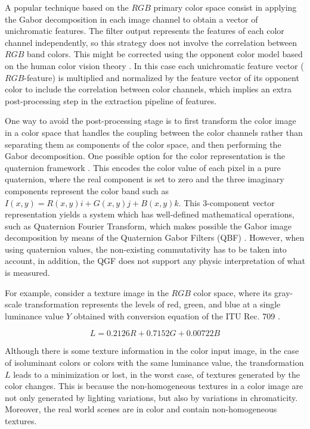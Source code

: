 A popular technique based on the $RGB$ primary color space consist in applying the Gabor decomposition in each image channel to obtain a vector of unichromatic features. The filter output represents the features of each color channel independently, so this strategy does not involve the correlation between $RGB$ band colors. This might be corrected using the opponent color model based on the human color vision theory \citep{Jain.Healey:TIP:1998}. In this case each unichromatic feature vector ($RGB$-feature) is multiplied and normalized by the feature vector of its opponent color to include the correlation between color channels, which implies an extra post-processing step in the extraction pipeline of features.

One way to avoid the post-processing stage is to first transform the color image in a color space that handles the coupling between the color channels rather than separating them as components of the color space, and then performing the Gabor decomposition. One possible option for the color representation is the quaternion framework \citep{Sangwine.Ell:VISP:2000}. This encodes the color value of each pixel in a pure quaternion, where the real component is set to zero and the three imaginary components represent the color band such as $I(x, y) = R (x, y) i + G (x, y) j + B (x, y) k $. This 3-component vector representation yields a system which has well-defined mathematical operations, such as Quaternion Fourier Transform, which makes possible the Gabor image decomposition by means of the Quaternion Gabor Filters (QBF) \citep{Subakan.Vemuri:EMMCVPR:2009}. However, when using quaternion values, the non-existing commutativity has to be taken into account, in addition, the QGF does not support any physic interpretation of what is measured.

For example, consider a texture image in the $RGB$ color space, where its gray-scale transformation represents the levels of red, green, and blue at a single luminance value $Y$ obtained with conversion equation of the ITU Rec. 709 \citep{Artusi.Banterle.ea:Book:2016}.

\begin{equation}\label{eq:color2gray_formula}
    L = 0.2126 R + 0.7152 G + 0.00722 B
\end{equation}
 
Although there is some texture information in the color input image, in the case of isoluminant colors or colors with the same luminance value, the transformation $L$ leads to a minimization or lost, in the worst case, of textures generated by the color changes. This is because the non-homogeneous textures in a color image are not only generated by lighting variations, but also by variations in chromaticity. Moreover, the real world scenes are in color and contain non-homogeneous textures.

